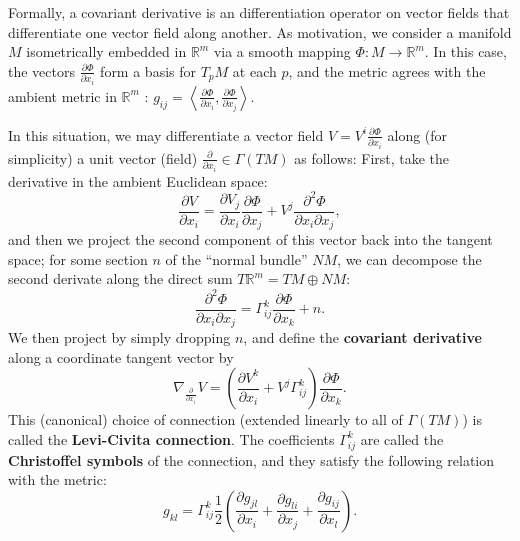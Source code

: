 \documentclass[reqno]{amsart}
\numberwithin{equation}{section}
\begin{document}
Formally, a covariant derivative is an differentiation operator on vector fields that differentiate one
vector field along another. 
As motivation, we consider a manifold $M$
isometrically embedded in $\mathbb R^m$ via a smooth mapping $\Phi : M \to \mathbb R^m$.
In this case, the vectors $\frac{\partial \Phi}{\partial x_i}$ form a basis for $T_pM$ at each $p$, and
the metric agrees with the ambient metric in $\mathbb R^m$ :
$g_{ij} = \left\langle \frac{\partial \Phi}{\partial x_i}, \frac{\partial \Phi}{\partial x_j} \right\rangle$.

In this situation, we may differentiate a vector field $V = V^i \frac{\partial \Phi}{\partial x_i}$ along
(for simplicity) a unit vector (field) $\frac{\partial}{\partial x_i} \in \Gamma(TM)$ as follows: First, take
the derivative in the ambient Euclidean space:
$$
    \frac{\partial V}{\partial x_i}
        = \frac{\partial V_j}{\partial x_i}\frac{\partial \Phi}{\partial x_j} +
            V^j \frac{\partial^2 \Phi}{\partial x_i \partial x_j},
$$
and then we project the second component of this vector back into the tangent space; for some section $n$
of the ``normal bundle'' $NM$, we can decompose the second derivate along the direct sum
$T\mathbb R^m = TM \oplus NM$:
$$
    \frac{\partial^2 \Phi}{\partial x_i \partial x_j}
        = \Gamma^k_{ij} \frac{\partial \Phi}{\partial x_k} + n.
$$
We then project by simply dropping $n$, and define the \textbf{covariant derivative} along a coordinate tangent
vector by
$$
    \nabla_{\frac{\partial}{\partial x_i}} V = \left( \frac{\partial V^k}{\partial x_i} + V^j \Gamma^k_{ij}
        \right) \frac{\partial \Phi}{\partial x_k}.
$$
This (canonical) choice of connection (extended linearly to all of $\Gamma(TM)$)
is called the \textbf{Levi-Civita connection}.
The coefficients $\Gamma^k_{ij}$ are called the \textbf{Christoffel symbols} of the connection, and they satisfy
the following relation with the metric:
\begin{equation}
    g_{kl}  = \Gamma^k_{ij} \frac 12 \left(\frac{\partial g_{jl}}{\partial x_i}
        + \frac{\partial g_{li}}{\partial x_j} + \frac{\partial g_{ij}}{\partial x_l} \right).
\label{christoffel}
\end{equation}
\end{document}
